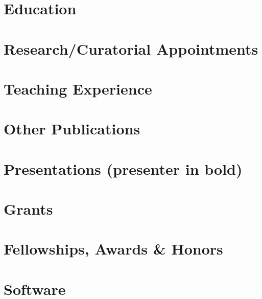 

\newcommand{\longcontent}[1]{#1}

\newcommand{\docTitle}{Curriculum Vitae\xspace}


\singlespacing



\section*{Education}


\section*{Research/Curatorial Appointments}


\longcontent{
\section*{Teaching Experience}

}

\nocite{*}
\printbibliography

\longcontent{
\section*{Other Publications}

}

\longcontent{
\section*{Presentations (presenter in bold)}

}

\section*{Grants}


\section*{Fellowships, Awards \& Honors}


\longcontent{
\section*{Software}

}

